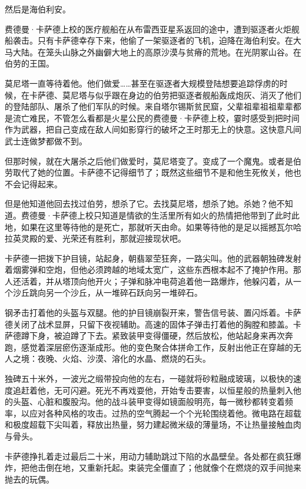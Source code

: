 \documentclass[AutoFakeBold=true]{book}
\begin{document}
然后是海伯利安。

费德曼·卡萨德上校的医疗舰船在从布雷西亚星系返回的途中，遭到驱逐者火炬舰船袭击。只有卡萨德幸存下来，他偷了一架驱逐者的飞机，迫降在海伯利安。在大马大陆。在笼头山脉之外幽僻大地上的高原沙漠与贫瘠的荒地。在光阴冢山谷。在伯劳的王国。

莫尼塔一直等待着他。他们做爱……甚至在驱逐者大规模登陆想要追踪俘虏的时候，在卡萨德、莫尼塔与似乎跟在身边的伯劳把驱逐者舰船轰成炮灰、消灭了他们的登陆部队、屠杀了他们军队的时候。来自塔尔锡斯贫民窟，父辈祖辈祖祖辈辈都是流亡难民，不管怎么看都是火星公民的费德曼·卡萨德上校，霎时感受到把时间作为武器，把自己变成在敌人间如影穿行的破坏之王时那无上的快意。这快意凡间武士连做梦都做不到。

但那时候，就在大屠杀之后他们做爱时，莫尼塔变了。变成了一个魔鬼。或者是伯劳取代了她的位置。卡萨德不记得细节了；既然这些细节不是和他生死攸关，他也{\kaishu 不会}记得起来。

但是他知道他回去找过伯劳，想杀了它。去找莫尼塔，想杀了她。杀她？他不知道。费德曼·卡萨德上校只知道是情欲的生活里所有如火的热情把他带到了此时此地，如果在这里等待他的是死亡，那就听天由命。如果等待他的是足以摇撼瓦尔哈拉英灵殿的爱、光荣还有胜利，那就迎接现状吧。

\vspace*{1em}

卡萨德一把拨下护目镜，站起身，朝翡翠茔狂奔，一路尖叫。他的武器朝独碑发射着烟雾弹和空炮，但他必须跨越的地域太宽广，这些东西根本起不了掩护作用。那人还活着，并从塔顶向他开火；子弹和脉冲电荷追着他一路爆炸，他躲闪着，从一个沙丘跳向另一个沙丘，从一堆碎石跃向另一堆碎石。

钢矛击打着他的头盔与双腿。他的护目镜崩裂开来，警告信号装、置闪烁着。卡萨德关闭了战术显屏，只留下夜视辅助。高速的固体子弹击打着他的胸膛和膝盖。卡萨德蹲下身，被迫蹲了下去。紧致装甲变得僵硬，然后放松，他站起身来再次奔跑，感觉着深层瘀伤逐渐成形。他的变色聚合体拼命工作，反射出他正在穿越的无人之境：夜晚、火焰、沙漠、溶化的水晶、燃烧的石头。

独碑五十米外，一波光之缎带投向他的左右，一碰就将砂粒融成玻璃，以极快的速度追赶着他，无可闪避。死光不再戏耍他，开始专击要害，以恒星般的热量刺入他的头盔、心脏和腹股沟。他的战斗装甲变得如镜面般明亮，每一微秒都转变着频率，以应对各种风格的攻击。过热的空气腾起一个个光轮围绕着他。微电路在超载和极度超载下尖叫着，释放出热量，努力建起微米级的薄量场，不让热量接触血肉与骨头。

卡萨德挣扎着走过最后二十米，用动力辅助跳过下陷的水晶壁垒。各处都在疯狂爆炸，把他击倒在地，又重新托起。束装完全僵直了；他就像个在燃烧的双手间抛来抛去的玩偶。
\end{document}
